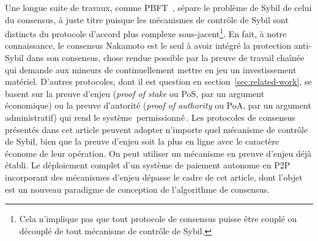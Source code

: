 \documentclass[a4,twocolumn,10pt]{article}
\theoremstyle{definition}
\begin{document}
Une longue suite de travaux, comme PBFT~\cite{castro1999practical}, sépare le problème de Sybil de celui du consensus, à juste titre puisque les mécanismes de contrôle de Sybil sont distincts du protocole d'accord plus complexe sous-jacent\footnote{Cela n'implique pas que tout protocole de consensus puisse être couplé ou découplé de tout mécanisme de contrôle de Sybil.}.
En fait, à notre connaissance, le consensus Nakamoto est le seul à avoir intégré la protection anti-Sybil dans son consensus, chose rendue possible par la preuve de travail chaînée~\cite{aspnes2005exposing} qui demande aux mineurs de continuellement mettre en jeu un investissement matériel.
D'autres protocoles, dont il est question en section~\ref{sec:related-work}, se basent sur la preuve d'enjeu (\emph{proof of stake} ou PoS, par un argument économique) ou la preuve d'autorité (\emph{proof of authority} ou PoA, par un argument administratif) qui rend le système \guillemotleft\,permissionné\,\guillemotright.
Les protocoles de consensus présentés dans cet article peuvent adopter n'importe quel mécanisme de contrôle de Sybil, bien que la preuve d'enjeu soit la plus en ligne avec le caractère économe de leur opération.
On peut utiliser un mécanisme en preuve d'enjeu déjà établi.
Le déploiement complet d'un système de paiement autonome en P2P incorporant des mécanismes d'enjeu dépasse le cadre de cet article, dont l'objet est un nouveau paradigme de conception de l'algorithme de consensus.
\end{document}
